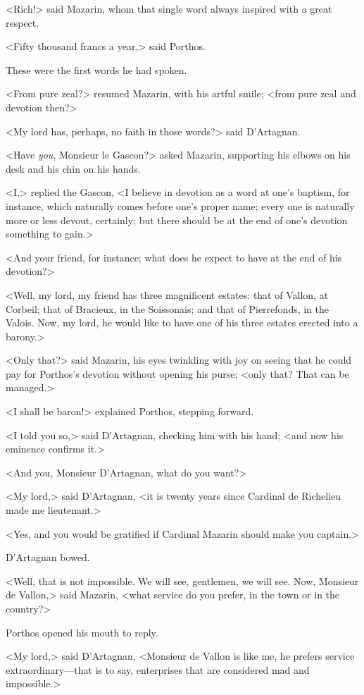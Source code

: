 <Rich!> said Mazarin, whom that single word always inspired with a great respect.

<Fifty thousand francs a year,> said Porthos.

These were the first words he had spoken.

<From pure zeal?> resumed Mazarin, with his artful smile; <from pure zeal and devotion then?>

<My lord has, perhaps, no faith in those words?> said D'Artagnan.

<Have \emph{you}, Monsieur le Gascon?> asked Mazarin, supporting his elbows on his desk and his chin on his hands.

<I,> replied the Gascon, <I believe in devotion as a word at one's baptism, for instance, which naturally comes before one's proper name; every one is naturally more or less devout, certainly; but there should be at the end of one's devotion something to gain.>

<And your friend, for instance; what does he expect to have at the end of his devotion?>

<Well, my lord, my friend has three magnificent estates: that of Vallon, at Corbeil; that of Bracieux, in the Soissonais; and that of Pierrefonds, in the Valois. Now, my lord, he would like to have one of his three estates erected into a barony.>

<Only that?> said Mazarin, his eyes twinkling with joy on seeing that he could pay for Porthos's devotion without opening his purse; <only that? That can be managed.>

<I shall be baron!> explained Porthos, stepping forward.

<I told you so,> said D'Artagnan, checking him with his hand; <and now his eminence confirms it.>

<And you, Monsieur D'Artagnan, what do you want?>

<My lord,> said D'Artagnan, <it is twenty years since Cardinal de Richelieu made me lieutenant.>

<Yes, and you would be gratified if Cardinal Mazarin should make you captain.>

D'Artagnan bowed.

<Well, that is not impossible. We will see, gentlemen, we will see. Now, Monsieur de Vallon,> said Mazarin, <what service do you prefer, in the town or in the country?>

Porthos opened his mouth to reply.

<My lord,> said D'Artagnan, <Monsieur de Vallon is like me, he prefers service extraordinary—that is to say, enterprises that are considered mad and impossible.>

